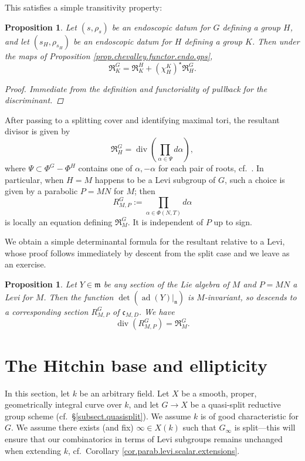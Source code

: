 \documentclass[openany]{amsbook}
\newtheorem{proposition}[theorem]{Proposition}
\theoremstyle{definition}
\theoremstyle{remark}
\numberwithin{equation}{section}
\renewcommand{\-}{\operatorname{-}}
\newcommand{\on}[1]{\operatorname{#1}}
\newcommand{\fm}{\mathfrak{m}}
\newcommand{\fc}{\mathfrak{c}}
\newcommand{\fn}{\mathfrak{n}}
\renewcommand{\fm}{\mathfrak{m}}
\newcommand{\fR}{\mathfrak{R}}
\newcommand{\ad}{\on{ad}}
\begin{document}
This satisfies a simple transitivity property:
\begin{proposition}\label{prop.resultant.transitive}
    Let $(s, \rho_s)$ be an endoscopic datum for $G$ defining a group $H$, and let $(s_H, \rho_{s_H})$ be an endoscopic datum for $H$ defining a group $K$. Then under the maps of Proposition \ref{prop.chevalley.functor.endo.gps},
    $$
        \fR_K^G = \fR_K^H + (\chi^K_H)^\star \fR_H^G.
    $$
    \begin{proof}
        Immediate from the definition and functoriality of pullback for the discriminant.
    \end{proof}
\end{proposition}

After passing to a splitting cover and identifying maximal tori, the resultant divisor is given by
$$
    \fR_H^G = \on{div} \left(\prod_{\alpha \in \Psi} d\alpha \right),
$$
where $\Psi \subset \Phi^{G} - \Phi^{H}$ contains one of $\alpha, -\alpha$ for each pair of roots, cf.\ \cite[Lemme 1.10.2]{ngofl}. In particular, when $H = M$ happens to be a Levi subgroup of $G$, such a choice is given by a parabolic $P = MN$ for $M$; then
$$
    R_{M,P}^G := \prod_{\alpha \in \Phi(N,T)} d \alpha
$$
is locally an equation defining $\fR^G_M$. It is independent of $P$ up to sign.

We obtain a simple determinantal formula for the resultant relative to a Levi, whose proof follows immediately by descent from the split case and we leave as an exercise.
\begin{proposition}\label{prop.unip.formula.for.resultant}
    Let $Y \in \fm$ be any section of the Lie algebra of $M$ and $P = MN$ a Levi for $M$. Then the function $\det(\ad(Y)|_{\fn})$ is $M$-invariant, so descends to a corresponding section $R_{M,P}^G$ of $\fc_{M,D}$. We have
    $$
        \on{div}(R_{M,P}^G) = \fR_M^G.
    $$
\end{proposition}















\chapter{The Hitchin base and ellipticity}\label{sect.Hitchin.base}


In this section, let $k$ be an arbitrary field. Let $X$ be a smooth, proper, geometrically integral curve over $k$, and let $G \to X$ be a quasi-split reductive group scheme (cf.\ \S \ref{subsect.quasisplit}). We assume $k$ is of good characteristic for $G$. We assume there exists (and fix) $\infty \in X(k)$ such that $G_\infty$ is split---this will ensure that our combinatorics in terms of Levi subgroups remains unchanged when extending $k$, cf.\ Corollary \ref{cor.parab.levi.scalar.extensions}. 
\end{document}

